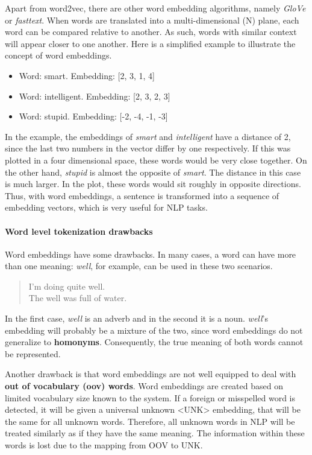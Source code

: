 Apart from word2vec, there are other word embedding algorithms, namely \textit{GloVe} or \textit{fasttext}. When words are translated into a multi-dimensional (N) plane, each word can be compared relative to another. As such, words with similar context will appear closer to one another. Here is a simplified example to illustrate the concept of word embeddings.

\begin{itemize}
    \item Word: smart. Embedding: [2, 3, 1, 4]
    \item Word: intelligent. Embedding: [2, 3, 2, 3]
    \item Word: stupid. Embedding: [-2, -4, -1, -3]
\end{itemize}

In the example, the embeddings of \emph{smart} and \emph{intelligent} have a distance of 2, since the last two numbers in the vector differ by one respectively. If this was plotted in a four dimensional space, these words would be very close together. On the other hand, \emph{stupid} is almost the opposite of \emph{smart}. The distance in this case is much larger. In the plot, these words would sit roughly in opposite directions. Thus, with word embeddings, a sentence is transformed into a sequence of embedding vectors, which is very useful for NLP tasks.

\paragraph{Word level tokenization drawbacks}

Word embeddings have some drawbacks. In many cases, a word can have more than one meaning: \emph{well}, for example, can be used in these two scenarios.

\begin{quote}
    I'm doing quite well.\\
    The well was full of water.
\end{quote}

In the first case, \textit{well} is an adverb and in the second it is a noun. \emph{well}'s embedding will probably be a mixture of the two, since word embeddings do not generalize to \textbf{homonyms}. Consequently, the true meaning of both words cannot be represented.

Another drawback is that word embeddings are not well equipped to deal with \textbf{out of vocabulary (oov) words}. Word embeddings are created based on limited vocabulary size known to the system. If a foreign or misspelled word is detected, it will be given a universal unknown <UNK> embedding, that will be the same for all unknown words. Therefore, all unknown words in NLP will be treated similarly as if they have the same meaning. The information within these words is lost due to the mapping from OOV to UNK.

